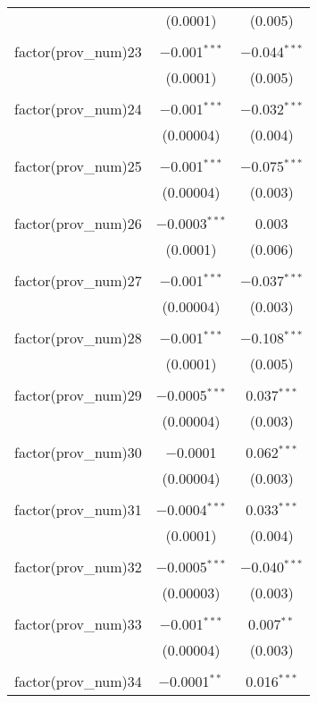 \begin{table}[!htbp]
\begin{tabular}{@{\extracolsep{5pt}}lcc}
  & (0.0001) & (0.005) \\ 
  & & \\ 
 factor(prov\_num)23 & $-$0.001$^{***}$ & $-$0.044$^{***}$ \\ 
  & (0.0001) & (0.005) \\ 
  & & \\ 
 factor(prov\_num)24 & $-$0.001$^{***}$ & $-$0.032$^{***}$ \\ 
  & (0.00004) & (0.004) \\ 
  & & \\ 
 factor(prov\_num)25 & $-$0.001$^{***}$ & $-$0.075$^{***}$ \\ 
  & (0.00004) & (0.003) \\ 
  & & \\ 
 factor(prov\_num)26 & $-$0.0003$^{***}$ & 0.003 \\ 
  & (0.0001) & (0.006) \\ 
  & & \\ 
 factor(prov\_num)27 & $-$0.001$^{***}$ & $-$0.037$^{***}$ \\ 
  & (0.00004) & (0.003) \\ 
  & & \\ 
 factor(prov\_num)28 & $-$0.001$^{***}$ & $-$0.108$^{***}$ \\ 
  & (0.0001) & (0.005) \\ 
  & & \\ 
 factor(prov\_num)29 & $-$0.0005$^{***}$ & 0.037$^{***}$ \\ 
  & (0.00004) & (0.003) \\ 
  & & \\ 
 factor(prov\_num)30 & $-$0.0001 & 0.062$^{***}$ \\ 
  & (0.00004) & (0.003) \\ 
  & & \\ 
 factor(prov\_num)31 & $-$0.0004$^{***}$ & 0.033$^{***}$ \\ 
  & (0.0001) & (0.004) \\ 
  & & \\ 
 factor(prov\_num)32 & $-$0.0005$^{***}$ & $-$0.040$^{***}$ \\ 
  & (0.00003) & (0.003) \\ 
  & & \\ 
 factor(prov\_num)33 & $-$0.001$^{***}$ & 0.007$^{**}$ \\ 
  & (0.00004) & (0.003) \\ 
  & & \\ 
 factor(prov\_num)34 & $-$0.0001$^{**}$ & 0.016$^{***}$ \\ 

\end{tabular}
\end{table}

